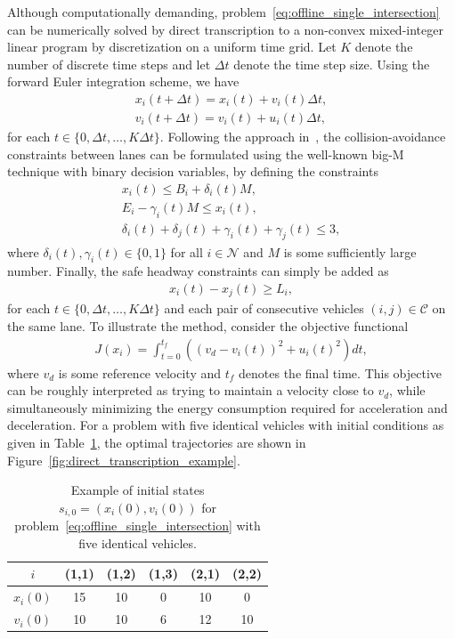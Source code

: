 \documentclass[a4paper]{article}
\theoremstyle{definition}
\theoremstyle{plain}
\begin{document}
Although computationally demanding,
problem~\eqref{eq:offline_single_intersection} can be numerically solved by
direct transcription to a non-convex mixed-integer linear program by
discretization on a uniform time grid. Let $K$ denote the number of discrete
time steps and let $\Delta t$ denote the time step size.
%
Using the forward Euler integration scheme, we have
\begin{align*}
  x_{i}(t + \Delta t) = x_{i}(t) + v_{i}(t) \Delta t , \\
  v_{i}(t + \Delta t) = v_{i}(t) + u_{i}(t) \Delta t ,
\end{align*}
for each $t \in \{0, \Delta t, \dots, K \Delta t\}$. Following the approach in~\cite{hultApproximateSolutionOptimal2015}, the
collision-avoidance constraints between lanes can be formulated using the
well-known big-M technique with binary decision variables, by defining the
constraints
\begin{align*}
  x_{i}(t) \leq B_{i} + \delta_{i}(t) M , \\
  E_{i} - \gamma_{i}(t) M \leq x_{i}(t) , \\
  \delta_{i}(t) + \delta_{j}(t) + \gamma_{i}(t) + \gamma_{j}(t) \leq 3 ,
\end{align*}
where $\delta_{i}(t), \gamma_{i}(t) \in \{ 0, 1 \}$ for all $i \in \mathcal{N}$ and $M$ is some
sufficiently large number.
%
Finally, the safe headway constraints can simply be added as
\begin{align*}
  x_{i}(t) - x_{j}(t) \geq L_{i} ,
\end{align*}
for each $t \in \{0, \Delta t, \dots, K \Delta t\}$ and each pair of consecutive
vehicles $(i, j) \in \mathcal{C}$ on the same lane.
%
To illustrate the method, consider the objective functional
\begin{align*}
  J(x_{i}) = \int_{t=0}^{t_{f}} \left( {(v_{d} - v_{i}(t))}^{2} + {u_{i}(t)}^{2} \right) dt ,
\end{align*}
where $v_{d}$ is some reference velocity and $t_{f}$ denotes the final time.
This objective can be roughly interpreted as trying to maintain a velocity close
to $v_{d}$, while simultaneously minimizing the energy consumption required for
acceleration and deceleration. For a problem with five identical vehicles with
initial conditions as given in Table~\ref{tab:hult_parameters}, the optimal
trajectories are shown in Figure~\ref{fig:direct_transcription_example}.

\begin{table}[H]
  \centering
\begin{tabular}{ c | c c c | c c }
  $i$  & {\color{armygreen}(1,1)} & {\color{armygreen}(1,2)} & {\color{armygreen}(1,3)} & {\color{red}(2,1)} & {\color{red}(2,2)} \\
  \hline
  $x_{i}(0)$ & 15 & 10 &  0 & 10 &  0 \\
  $v_{i}(0)$ & 10 & 10 &  6 & 12 & 10 \\
\end{tabular}
\caption{Example of initial states $s_{i,0} = (x_{i}(0), v_{i}(0))$ for
  problem~\eqref{eq:offline_single_intersection} with five identical vehicles.}
\label{tab:hult_parameters}
\end{table}
\end{document}
